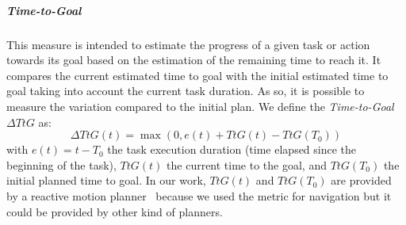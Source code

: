 \documentclass[a4paper,11pt,twoside]{StyleThese}
\begin{document}
\subparagraph{Time-to-Goal}\label{para:dtg_t}
This measure is intended to estimate the progress of a given task or action towards its goal based on the estimation of the remaining time to reach it. It compares the current estimated time to goal with the initial estimated time to goal taking into account the current task duration. As so, it is possible to measure the variation compared to the initial plan. We define the \textit{Time-to-Goal} $\Delta TtG$ as:
\begin{equation}\label{eq:ttg}
\Delta TtG(t) = \max(0, e(t)  + TtG(t) - TtG(T_0))
\end{equation}
with $e(t) = t - T_0$ the task execution duration (time elapsed since the beginning of the task), $TtG(t)$ the current time to the goal, and $TtG(T_0)$ the initial planned time to goal. In our work, $TtG(t)$ and $TtG(T_0)$ are provided by a reactive motion planner~\citep{khamb2019} because we used the metric for navigation but it could be provided by other kind of planners. 
\end{document}
